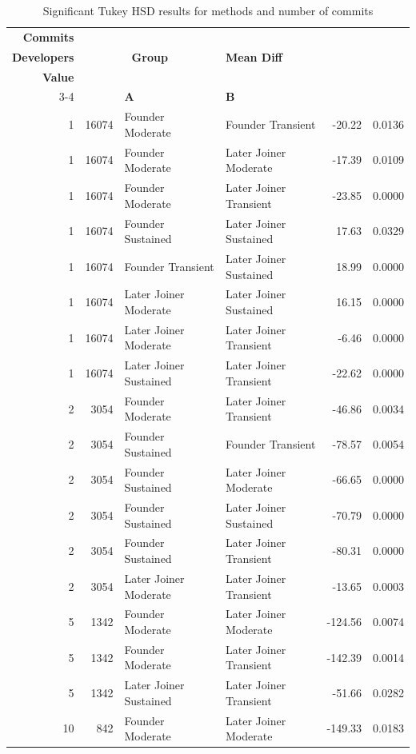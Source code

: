 \newpage 
\begin{table}[H]
\centering
\setlength{\tabcolsep}{2pt}
\caption[Significant Tukey HSD Results for methods]{Significant Tukey HSD results for methods and number of commits}
\begin{tabular}{r r l l r r}
\toprule
\textbf{Commits} & \makecell[t]{\textbf{Number of}\\\textbf{Developers}} & \multicolumn{2}{c}{\textbf{Group}} & \textbf{Mean Diff} & \makecell[t]{\textbf{Adj $P$}\\\textbf{Value}} \\ 
\cmidrule(lr){3-4}
 &  & \textbf{A} & \textbf{B} &  &  \\ 
\midrule
1 & 16074 & Founder Moderate & Founder Transient & -20.22 & 0.0136 \\ 
1 & 16074 & Founder Moderate & Later Joiner Moderate & -17.39 & 0.0109 \\ 
1 & 16074 & Founder Moderate & Later Joiner Transient & -23.85 & 0.0000 \\ 
1 & 16074 & Founder Sustained & Later Joiner Sustained & 17.63 & 0.0329 \\ 
1 & 16074 & Founder Transient & Later Joiner Sustained & 18.99 & 0.0000 \\ 
1 & 16074 & Later Joiner Moderate & Later Joiner Sustained & 16.15 & 0.0000 \\ 
1 & 16074 & Later Joiner Moderate & Later Joiner Transient & -6.46 & 0.0000 \\ 
1 & 16074 & Later Joiner Sustained & Later Joiner Transient & -22.62 & 0.0000 \\ 
2 & 3054 & Founder Moderate & Later Joiner Transient & -46.86 & 0.0034 \\ 
2 & 3054 & Founder Sustained & Founder Transient & -78.57 & 0.0054 \\ 
2 & 3054 & Founder Sustained & Later Joiner Moderate & -66.65 & 0.0000 \\ 
2 & 3054 & Founder Sustained & Later Joiner Sustained & -70.79 & 0.0000 \\ 
2 & 3054 & Founder Sustained & Later Joiner Transient & -80.31 & 0.0000 \\ 
2 & 3054 & Later Joiner Moderate & Later Joiner Transient & -13.65 & 0.0003 \\ 
5 & 1342 & Founder Moderate & Later Joiner Moderate & -124.56 & 0.0074 \\ 
5 & 1342 & Founder Moderate & Later Joiner Transient & -142.39 & 0.0014 \\ 
5 & 1342 & Later Joiner Sustained & Later Joiner Transient & -51.66 & 0.0282 \\ 
10 & 842 & Founder Moderate & Later Joiner Moderate & -149.33 & 0.0183 \\ 
\bottomrule
\end{tabular}%
\label{tab:codebase_graph_latex_repository_graph_component_time_series_tukey_hsdsigmethods} 
\end{table}
\newpage 
